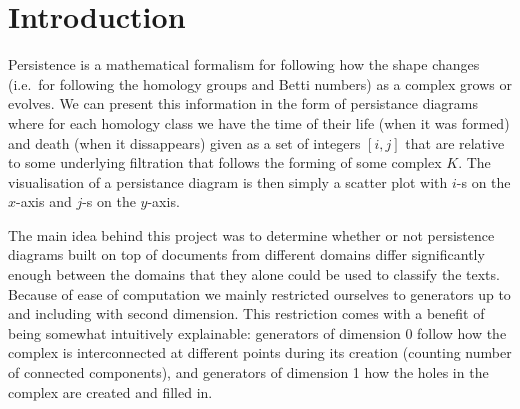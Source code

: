\section{Introduction} 
\label{sec:problem_description}

Persistence is a mathematical formalism for following how the shape changes
(i.e.\ for following the homology groups and Betti numbers) as a complex grows
or evolves. We can present this information in the form of persistance diagrams
where for each homology class we have the time of their life (when it was
formed) and death (when it dissappears) given as a set of integers $[i, j]$
that are relative to some underlying filtration that follows the forming of
some complex $K$. The visualisation of a persistance diagram is then simply a
scatter plot with $i$-s on the $x$-axis and $j$-s on the $y$-axis.

The main idea behind this project was to determine whether or not persistence
diagrams built on top of documents from different domains differ significantly
enough between the domains that they alone could be used to classify the texts.
Because of ease of computation we mainly restricted ourselves to generators up
to and including with second dimension. This restriction comes with a benefit
of being somewhat intuitively explainable: generators of dimension 0 follow how
the complex is interconnected at different points during its creation (counting
number of connected components), and generators of dimension 1 how the holes in
the complex are created and filled in.

